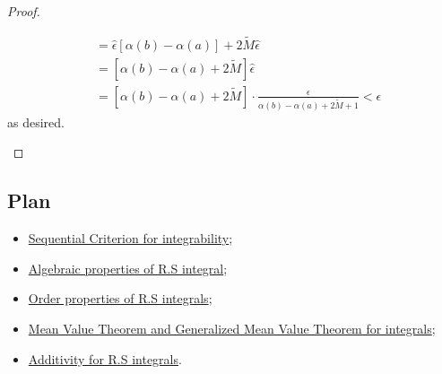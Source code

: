 \begin{proof}
\begin{enumerate}
\begin{align*}
                                                                                       &= \hat{\epsilon} [\alpha(b) - \alpha(a)] + 2 \tilde{M} \hat{\epsilon} \\
                                                                                       &= [\alpha(b) - \alpha(a) + 2 \tilde{M}] \hat{\epsilon} \\
                                                                                       &= [\alpha(b) - \alpha(a) + 2 \tilde{M}] \cdot \frac{ \epsilon }{ \alpha(b) - \alpha(a) + 2 \tilde{M} + 1  }  < \epsilon
            \end{align*}
            as desired.
    \end{enumerate}
\end{proof}

\subsection{Plan}

\begin{itemize}
    \item {\hyperref[Sequential Criterion for integrability]{Sequential Criterion for integrability}};
    \item {\hyperref[Algebraic properties of R.S integral]{Algebraic properties of R.S integral}};
    \item {\hyperref[Order properties of R.S integrals]{Order properties of R.S integrals}};
    \item {\hyperref[Mean Value Theorem and Generalized Mean Value Theorem for integrals]{Mean Value Theorem and Generalized Mean Value Theorem for integrals}};
    \item {\hyperref[Additivity for R.S integrals]{Additivity for R.S integrals}}.
\end{itemize}

